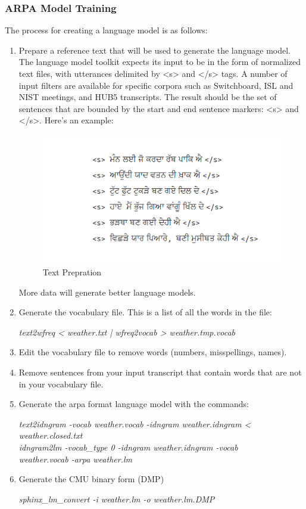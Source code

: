 \documentclass[12pt,a4paper,oldfontcommands]{memoir}
\begin{document}
\subsubsection{ARPA Model Training}
The process for creating a language model is as follows:
\begin{enumerate}
  \item  Prepare a reference text that will be used to generate the language model. The language model toolkit expects its input to be in the form of normalized text files, with utterances delimited by <s> and </s> tags. A number of input filters are available for specific corpora such as Switchboard, ISL and NIST meetings, and HUB5 transcripts. The result should be the set of sentences that are bounded by the start and end sentence markers: <s> and </s>. Here's an example: 

\begin{figure}[h]
    \centering
    \includegraphics[scale=1.0]{Screenshot2}
    \caption{Text Prepration}
\end{figure}

More data will generate better language models. 

  \item  Generate the vocabulary file. This is a list of all the words in the file:

	\textit{text2wfreq < weather.txt | wfreq2vocab > weather.tmp.vocab} 
  \item Edit the vocabulary file to remove words (numbers, misspellings, names).
  \item Remove sentences from your input transcript that contain words that are not in your vocabulary file.
  \item Generate the arpa format language model with the commands:

	 \textit{text2idngram -vocab weather.vocab -idngram weather.idngram < weather.closed.txt \\
	 idngram2lm -vocab\_type 0 -idngram weather.idngram -vocab \ \\
     	 weather.vocab -arpa weather.lm}
  \item Generate the CMU binary form (DMP) 

	\textit{sphinx\_lm\_convert -i weather.lm -o weather.lm.DMP}
\end{enumerate}
\end{document}
